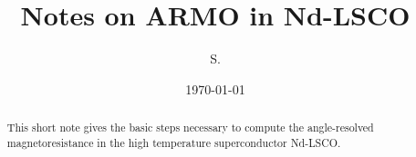 \documentclass[aps,twocolumn,showpacs,nofootinbib]{revtex4-1}
\begin{document}
\title{Notes on ARMO in Nd-LSCO}
\author{S. }
\date{\today}
\keywords{}
\begin{abstract}
This short note gives the basic steps necessary to compute the angle-resolved magnetoresistance in the high temperature superconductor Nd-LSCO.
\end{abstract}

\maketitle
\end{document}
